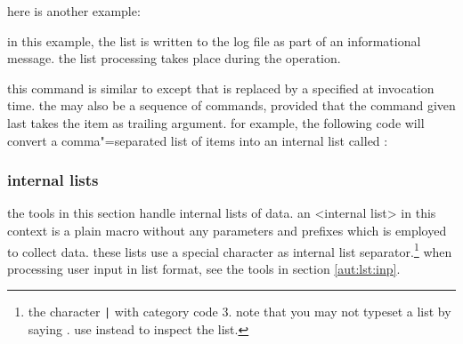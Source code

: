 \begin{ltxsyntax}
\begin{ltxcode}
\begin{itemize}
\renewcommand*{\do}[1]{\item #1}
\end{itemize}
\end{ltxcode}
%
here is another example:

\begin{ltxcode}
\renewcommand*{\do}[1]{* #1\messagebreak}
\end{ltxcode}
%
in this example, the list is written to the log file as part of an informational message. the list processing takes place during the  operation.


this command is similar to  except that  is replaced by a  specified at invocation time. the  may also be a sequence of commands, provided that the command given last takes the item as trailing argument. for example, the following code will convert a comma"=separated list of items into an internal list called :

\begin{ltxcode}
\end{ltxcode}

\end{ltxsyntax}

\subsubsection{internal lists}
\label{aut:lst:int}

the tools in this section handle internal lists of data. an <internal list> in this context is a plain macro without any parameters and prefixes which is employed to collect data. these lists use a special character as internal list separator.\footnote{the character \texttt{\string|} with category code 3. note that you may not typeset a list by saying . use  instead to inspect the list.} when processing user input in list format, see the tools in section \ref{aut:lst:inp}.

